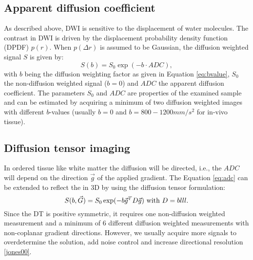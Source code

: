 \subsection*{Apparent diffusion coefficient}
As described above, DWI is sensitive to the displacement of water molecules. The contrast in DWI is driven by the displacement probability density function (DPDF) $p(r)$. When $p(\Delta r)$ is assumed to be Gaussian, the diffusion weighted signal $S$ is given by:
\begin{equation}
	S(b) = S_{0}\exp(-b\cdot ADC),
\end{equation}
with $b$ being the diffusion weighting factor as given in Equation \ref{eq:bvalue}, $S_{0}$ the non-diffusion weighted signal ($b=0$) and $ADC$ the apparent diffusion coefficient. The parameters $S_0$ and $ADC$ are properties of the examined sample and can be estimated by acquiring a minimum of two diffusion weighted images with different $b$-values (usually $b=0$ and $b=800-1200mm/s^2$ for in-vivo tissue). 
\subsection*{Diffusion tensor imaging}
In ordered tissue like white matter the diffusion will be directed, i.e., the $ADC$ will depend on the direction $\vec{g}$ of the applied gradient. The Equation \ref{eq:adc} can be extended to reflect the in 3D by using the diffusion tensor formulation:
\begin{equation}
	S(b,\vec{G}) = S_{0}\exp(-b\vec{g}^T D\vec{g}) \mbox{ with } D = blll.
\end{equation}
Since the DT is positive symmetric, it requires one non-diffusion weighted measurement and a minimum of 6 different diffusion weighted measurements with non-coplanar gradient directions. However, we usually acquire more signals to overdetermine the solution, add noise control and increase directional resolution \ref{jones00}.

